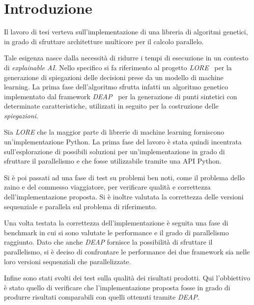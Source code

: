 \chapter*{Introduzione}

Il lavoro di tesi verteva sull'implementazione di una libreria di algoritmi
genetici, in grado di sfruttare architetture multicore per il calcolo parallelo.

Tale esigenza nasce dalla necessità di ridurre i tempi di esecuzione in un
contesto di \textit{explainable AI}. Nello specifico si fa riferimento al
progetto \textit{LORE}~\cite{DBLP:journals/corr/abs-1805-10820} per la
generazione di spiegazioni delle decisioni prese da un modello di machine
learning. La prima fase dell'algoritmo sfrutta infatti un algoritmo genetico
implementato dal framework \textit{DEAP}~\cite{DEAP_JMLR2012} per la
generazione di punti sintetici con determinate caratteristiche, utilizzati in
seguito per la costruzione delle \textit{spiegazioni}.

Sia \textit{LORE} che la maggior parte di librerie di machine learning
forniscono un'implementazione Python. La prima fase del lavoro è stata quindi
incentrata sull'esplorazione di possibili soluzioni per un'implementazione in
grado di sfruttare il parallelismo e che fosse utilizzabile tramite una API
Python.

Si è poi passati ad una fase di test su problemi ben noti, come il problema
dello zaino e del commesso viaggiatore, per verificare qualità e correttezza
dell'implementazione proposta. Si è inoltre valutata la correttezza delle
versioni sequenziale e parallela sul problema di riferimento.

Una volta testata la correttezza dell'implementazione è seguita una fase di
benchmark in cui si sono valutate le performance e il grado di parallelismo
raggiunto. Dato che anche \textit{DEAP} fornisce la possibilità di sfruttare il
parallelismo, si è deciso di confrontare le performance dei due framework sia
nelle loro versioni sequenziali che parallelizzate.

Infine sono stati svolti dei test sulla qualità dei risultati prodotti. Qui
l'obbiettivo è stato quello di verificare che l'implementazione proposta fosse
in grado di produrre risultati comparabili con quelli ottenuti tramite
\textit{DEAP}.